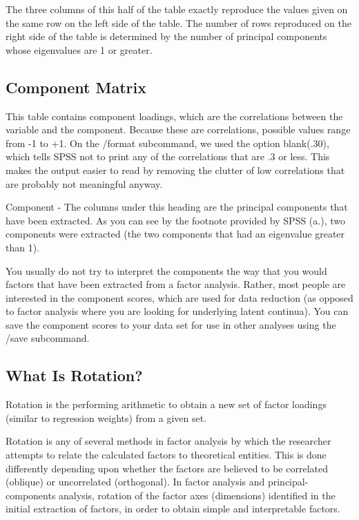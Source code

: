 The three columns of this half of the table exactly reproduce the values given on the same row on the left side of the table.  The number of rows reproduced on the right side of the table is determined by the number of principal components whose eigenvalues are 1 or greater.

\subsection{Component Matrix} This table contains component loadings, which are the correlations between the variable and the component.  Because these are correlations, possible values range from -1 to +1.  On the /format subcommand, we used the option blank(.30), which tells SPSS not to print any of the correlations that are .3 or less.  This makes the output easier to read by removing the clutter of low correlations that are probably not meaningful anyway.

Component - The columns under this heading are the principal components that have been extracted.  As you can see by the footnote provided by SPSS (a.), two components were extracted (the two components that had an eigenvalue greater than 1).

 You usually do not try to interpret the components the way that you would factors that have been extracted from a factor analysis.  Rather, most people are interested in the component scores, which are used for data reduction (as opposed to factor analysis where you are looking for underlying latent continua).  You can save the component scores to your data set for use in other analyses using the /save subcommand.
\subsection{What Is Rotation?}
Rotation is the performing arithmetic to obtain a new set of factor loadings (similar to regression weights) from a given set.

Rotation is any of several methods in factor analysis by which the researcher attempts to relate the calculated factors to theoretical entities. This is done differently depending upon whether the factors are believed to be correlated (oblique) or uncorrelated
(orthogonal). In factor analysis and principal-components analysis, rotation of the factor axes
(dimensions) identified in the initial extraction of factors, in order to obtain simple and interpretable
factors.

